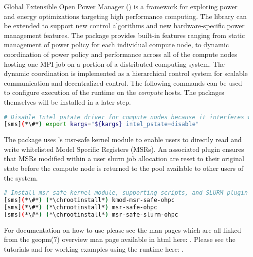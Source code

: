 Global Extensible Open Power Manager (\GEOPM{}) is a framework for exploring
power and energy optimizations targeting high performance computing.  The
library can be extended to support new control algorithms and new
hardware-specific power management features.  The \GEOPM{} package provides
built-in features ranging from static management of power policy for each
individual compute node, to dynamic coordination of power policy and
performance across all of the compute nodes hosting one MPI job on a portion of
a distributed computing system.  The dynamic coordination is implemented as a
hierarchical control system for scalable communication and decentralized
control. The following commands can be used to configure execution of the
\GEOPM{} runtime on the {\em compute} hosts. The packages themselves will be
installed in a later step.

\begin{lstlisting}[language=bash,keywords={},upquote=true]
# Disable Intel pstate driver for compute nodes because it interferes with GEOPM's operation.
[sms](*\#*) export kargs="${kargs} intel_pstate=disable"
\end{lstlisting}

\noindent The \GEOPM{} package uses \OHPC{}'s msr-safe kernel module
to enable users to directly read and write whitelisted Model Specific
Registers (MSRs).  An associated \SLURM{} plugin ensures that MSRs modified
within a user slurm job allocation are reset to their original state
before the compute node is returned to the pool available to other
users of the system.

\begin{lstlisting}[language=bash,keywords={},upquote=true]
# Install msr-safe kernel module, supporting scripts, and SLURM plugin
[sms](*\#*) (*\chrootinstall*) kmod-msr-safe-ohpc
[sms](*\#*) (*\chrootinstall*) msr-safe-ohpc
[sms](*\#*) (*\chrootinstall*) msr-safe-slurm-ohpc
\end{lstlisting}

For documentation on how to use \GEOPM{} please see
the \GEOPM{} man pages which are all linked from the geopm(7) overview
man page available in html here:
\href{http://geopm.github.io/man/geopm.7.html}
{\color{blue}{http://geopm.github.io/man/geopm.7.html}}.
Please see the \GEOPM{} tutorials and for working examples using the
\GEOPM{} runtime here: \href{https://github.com/geopm/geopm/tree/dev/tutorial}
{\color{blue}{https://github.com/geopm/geopm/tree/dev/tutorial}}.
